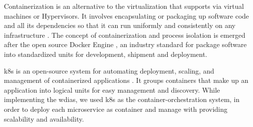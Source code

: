 



Containerization is an alternative to the virtualization that supports via virtual machines or Hypervisors. It involves encapsulating or packaging up software code and all its dependencies so that it can run uniformly and consistently on any infrastructure \cite{IBMContainerizationExplained}. The concept of containerization and process isolation is emerged after the open source Docker Engine \cite{DockerAppContainerization}, an industry standard for package software into standardized units for development, shipment and deployment.

\acrfull{k8s} is an open-source system for automating deployment, scaling, and management of containerized applications \cite{LinuxFoundationProduction-GradeKubernetes}. It groups containers that make up an application into logical units for easy management and discovery. While implementing the \acrshort{wdias}, we used \acrshort{k8s} as the container-orchestration system, in order to deploy each microservice as container and manage with providing scalability and availability.

